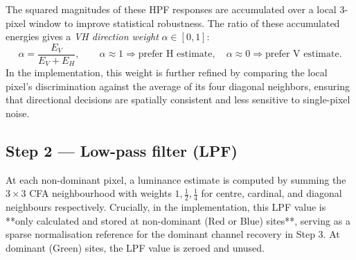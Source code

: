 \documentclass[a4paper,11pt]{article}
\newcommand{\tile}[6][]{%
  \if#4r\def\tilecol{cfared}\else
    \if#4g\def\tilecol{cfagreen}\else
      \if#4b\def\tilecol{cfablue}\else
        \def\tilecol{cfagrey}\fi\fi\fi
  \node[cfa-tile, fill=\tilecol!60, #1] (T#2#3) at (#2*0.8, -#3*0.8) {};
  \ifx&#5&\else\node[cfa-coords, above=0pt of T#2#3] {#5};\fi
  \ifx&#6&\else\node[cfa-weight] at (T#2#3) {#6};\fi
}
\begin{document}
The squared magnitudes of these HPF responses are accumulated over a local 3-pixel window to improve statistical robustness. The ratio of these accumulated energies gives a \emph{VH direction weight} $\alpha\in[0,1]$:
\[
  \alpha = \frac{E_V}{E_V + E_H}, \qquad
  \alpha\approx 1 \Rightarrow \text{prefer H estimate},\quad
  \alpha\approx 0 \Rightarrow \text{prefer V estimate}.
\]
In the implementation, this weight is further refined by comparing the local pixel's discrimination against the average of its four diagonal neighbors, ensuring that directional decisions are spatially consistent and less sensitive to single-pixel noise.

\subsection{Step 2 — Low-pass filter (LPF)}
At each non-dominant pixel, a luminance estimate is computed by summing the $3\times3$ CFA neighbourhood with weights $1, \tfrac12, \tfrac14$ for centre, cardinal, and diagonal neighbours respectively. Crucially, in the implementation, this LPF value is **only calculated and stored at non-dominant (Red or Blue) sites**, serving as a sparse normalisation reference for the dominant channel recovery in Step 3. At dominant (Green) sites, the LPF value is zeroed and unused.

\begin{center}
\end{center}
\end{document}
